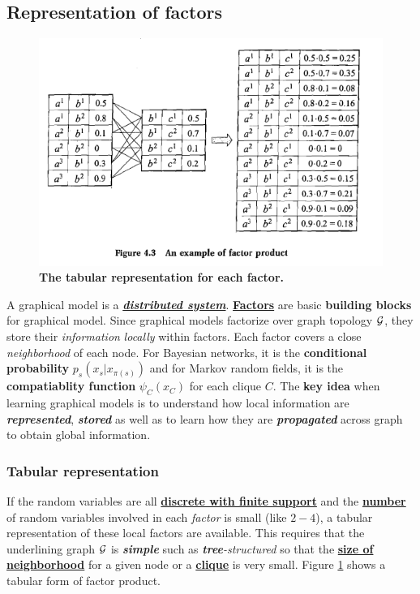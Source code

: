 \documentclass[11pt]{article}
\begin{document}
\subsection{Representation of factors}
\begin{figure}
\begin{minipage}[t]{1\linewidth}
  \centering
  \centerline{\includegraphics[scale = 0.45]{tab_factor.png}}
\end{minipage}
\caption{\footnotesize{\textbf{The tabular representation for each factor.}}}
\label{fig: tab_factor}
\end{figure}

A graphical model is a \emph{\textbf{\underline{distributed system}}}. \underline{\textbf{Factors}} are basic \textbf{building blocks} for graphical model. Since graphical models factorize over graph topology ${\mathcal G}$, they store their \emph{information} \emph{locally} within  factors. Each factor covers a close \emph{neighborhood} of each node. For Bayesian networks, it is the \textbf{conditional probability}  $p_s(x_s | x_{\pi(s)})$ and for Markov random fields, it is the \textbf{compatiablity function} $\psi_{C}(x_{C})$ for each clique $C$. The \textbf{key idea} when learning graphical models is to understand how local information are \emph{\textbf{represented}}, \emph{\textbf{stored}} as well as to learn how they are \emph{\textbf{propagated}} across graph to obtain global information. 

\subsubsection{Tabular representation}
If the random variables are all \underline{\textbf{discrete with finite support}} and the \underline{\textbf{number}} of random variables involved in each \textit{factor} is small (like $2-4$), a tabular representation of these local factors are available. This requires that the underlining graph ${\mathcal G}$ is \emph{\textbf{simple}} such as \emph{\textbf{tree}-structured} so that the  \underline{\textbf{size of neighborhood}} for a given node or a \underline{\textbf{clique}} is very small. Figure \ref{fig: tab_factor} shows a tabular form of factor product.
\end{document}

